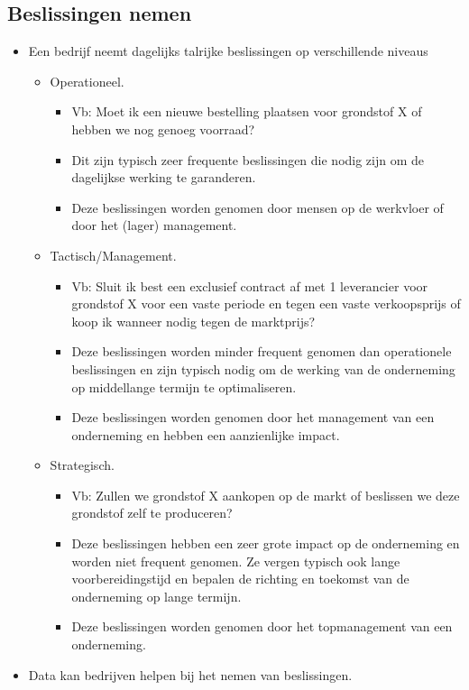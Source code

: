\documentclass[]{memoir}
\providecommand{\tightlist}{%
  \setlength{\itemsep}{0pt}\setlength{\parskip}{0pt}}
\begin{document}
\hypertarget{beslissingen-nemen}{%
\subsection*{Beslissingen nemen}\label{beslissingen-nemen}}

\begin{itemize}
\tightlist
\item
  Een bedrijf neemt dagelijks talrijke beslissingen op verschillende niveaus

  \begin{itemize}
  \tightlist
  \item
    Operationeel.

    \begin{itemize}
    \tightlist
    \item
      Vb: Moet ik een nieuwe bestelling plaatsen voor grondstof X of hebben we nog genoeg voorraad?
    \item
      Dit zijn typisch zeer frequente beslissingen die nodig zijn om de dagelijkse werking te garanderen.
    \item
      Deze beslissingen worden genomen door mensen op de werkvloer of door het (lager) management.
    \end{itemize}
  \item
    Tactisch/Management.

    \begin{itemize}
    \tightlist
    \item
      Vb: Sluit ik best een exclusief contract af met 1 leverancier voor grondstof X voor een vaste periode en tegen een vaste verkoopsprijs of koop ik wanneer nodig tegen de marktprijs?
    \item
      Deze beslissingen worden minder frequent genomen dan operationele beslissingen en zijn typisch nodig om de werking van de onderneming op middellange termijn te optimaliseren.
    \item
      Deze beslissingen worden genomen door het management van een onderneming en hebben een aanzienlijke impact.
    \end{itemize}
  \item
    Strategisch.

    \begin{itemize}
    \tightlist
    \item
      Vb: Zullen we grondstof X aankopen op de markt of beslissen we deze grondstof zelf te produceren?
    \item
      Deze beslissingen hebben een zeer grote impact op de onderneming en worden niet frequent genomen. Ze vergen typisch ook lange voorbereidingstijd en bepalen de richting en toekomst van de onderneming op lange termijn.
    \item
      Deze beslissingen worden genomen door het topmanagement van een onderneming.
    \end{itemize}
  \end{itemize}
\item
  Data kan bedrijven helpen bij het nemen van beslissingen.


\end{itemize}
\end{document}

